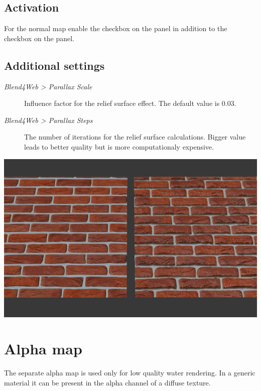 \documentclass[a4paper,12pt,oneside]{sphinxmanual}
\begin{document}
\subsection{Activation}
\label{textures:id10}
For the normal map enable the  checkbox on the  panel in addition to the  checkbox on the  panel.


\subsection{Additional settings}
\label{textures:id11}\begin{description}
\item[{\emph{Blend4Web \textgreater{} Parallax Scale}}] \leavevmode
Influence factor for the relief surface effect. The default value is 0.03.

\item[{\emph{Blend4Web \textgreater{} Parallax Steps}}] \leavevmode
The number of iterations for the relief surface calculations. Bigger value leads to better quality but is more computationaly expensive.

\end{description}

{\hfill\includegraphics[width=1.000\linewidth]{parallax.jpg}\hfill}

\begin{DUlineblock}{0em}
\item[] 
\end{DUlineblock}


\section{Alpha map}
\label{textures:alpha-map}\label{textures:texture-alpha-map}\label{textures:index-8}
The separate alpha map is used only for low quality water rendering. In a generic material it can be present in the alpha channel of a diffuse texture.
\end{document}
